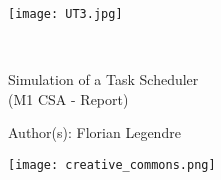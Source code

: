 \documentclass[a4paper, french]{article}
\begin{document}
\begin{titlepage}
    \begin{flushleft}
        \texttt{[image: UT3.jpg]}\par
        \centering
        
        \vspace{13\baselineskip}       
        \HRule \\[0.4cm]

        {\Huge 
        Simulation of a Task Scheduler\\ (M1 CSA - Report)\par}
        \vspace{0.4cm}
        \HRule
        \vfill
      
        Author(s): Florian Legendre\medskip \par
        
        \texttt{[image: creative\_commons.png]}\par
    \end{flushleft}
\end{titlepage}


\newpage
\pagestyle{empty}
\tableofcontents
{}
\pagestyle{plain}

\newpage





\end{document}
